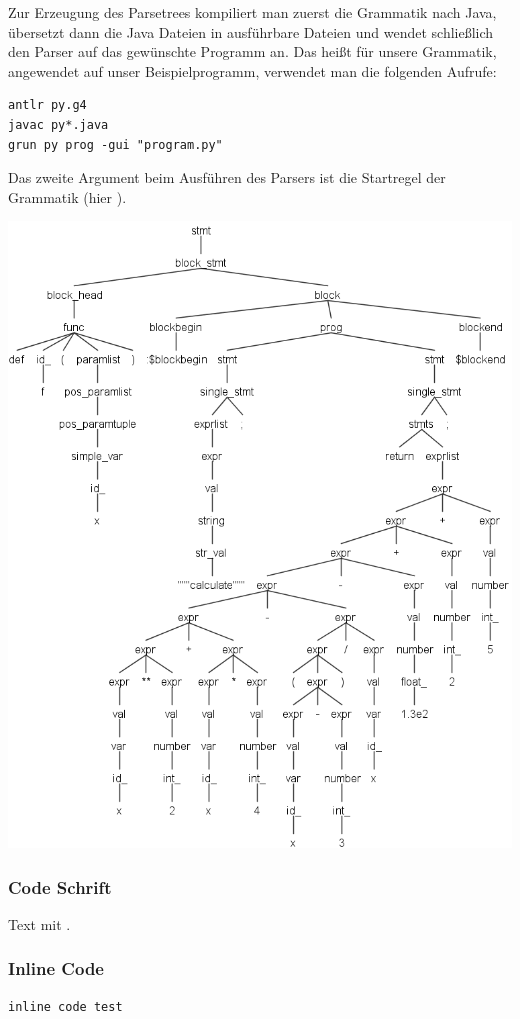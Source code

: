 Zur Erzeugung des Parsetrees kompiliert man zuerst die Grammatik nach Java, übersetzt dann die Java Dateien in ausführbare Dateien und wendet schließlich den Parser auf das gewünschte Programm an. Das heißt für unsere Grammatik, angewendet auf unser Beispielprogramm, verwendet man die folgenden Aufrufe:
\begin{lstlisting}
antlr py.g4
javac py*.java
grun py prog -gui "program.py"
\end{lstlisting}
Das zweite Argument  beim Ausführen des Parsers ist die Startregel der Grammatik (hier ).
\begin{center}
 \includegraphics[width=0.8\linewidth]{Bilder/program_func_parse_tree2.png}
  \label{g:tree}
\end{center}



\clearpage
\nocite{*}
\printbibliography



\subsubsection*{Code Schrift}
Text mit   .

\subsubsection*{Inline Code}
\begin{lstlisting}[caption=CAP]
inline code test
\end{lstlisting}

